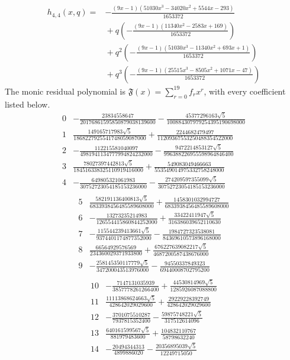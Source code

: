 \[
\begin{split}
h_{4,4}(x,q)={}&- \frac{\left(9 x - 1\right) \left(51030 x^{3} - 34020 x^{2} + 5544 x - 293\right)}{1653372}\\
&{}+q\left(- \frac{\left(9 x - 1\right) \left(11340 x^{2} - 2583 x + 169\right)}{1653372}\right)\\
&{}+q^{2}\left(- \frac{\left(9 x - 1\right) \left(51030 x^{3} - 11340 x^{2} + 693 x + 1\right)}{1653372}\right)\\
&{}+q^{3}\left(- \frac{\left(9 x - 1\right) \left(25515 x^{3} - 8505 x^{2} + 1071 x - 47\right)}{1653372}\right)
\end{split}
\tag{ANP28}
\]
The monic residual polynomial is $\mathfrak F(x)=\sum_{r=0}^{19}f_rx^r$, with every coefficient listed below.
\[
\begin{array}{c|l}
0&- \frac{23834558647}{20176861595850879038139600} - \frac{45377296163 \sqrt{5}}{100884307979254395190698000}\\
1&\frac{149165717983 \sqrt{5}}{1868227925541748059087000} + \frac{2244682479497}{11209367553250488354522000}\\
2&- \frac{112215581040097}{4981941134777994824232000} - \frac{9472214853127 \sqrt{5}}{996388226955598964846400}\\
3&\frac{78027397442813 \sqrt{5}}{184516338325110919416000} + \frac{549083049466663}{553549014975332758248000}\\
4&- \frac{649805321061983}{30752723054185153236000} - \frac{274209597355099 \sqrt{5}}{30752723054185153236000}\\
\end{array}
\tag{ANP29}
\]
\[
\begin{array}{c|l}
5&\frac{582191136400813 \sqrt{5}}{6833938456485589608000} + \frac{1458301032994727}{6833938456485589608000}\\
6&- \frac{13273235214983}{126554415860844252000} + \frac{33422411947 \sqrt{5}}{316386039652110630}\\
7&- \frac{115544239413661 \sqrt{5}}{9374401174877352000} - \frac{1984727323538081}{84369610573896168000}\\
8&\frac{66564929576569}{234360029371933800} + \frac{676227639082217 \sqrt{5}}{4687200587438676000}\\
9&- \frac{258145350117779 \sqrt{5}}{347200043513976000} - \frac{94550337849323}{69440008702795200}\\
\end{array}
\tag{ANP30}
\]
\[
\begin{array}{c|l}
10&- \frac{7147131035939}{3857778261266400} + \frac{44530814969 \sqrt{5}}{1285926087088800}\\
11&\frac{11113868624663 \sqrt{5}}{428642029029600} + \frac{29229228392749}{428642029029600}\\
12&- \frac{3701075510287}{7937815352400} - \frac{59875748221 \sqrt{5}}{317512614096}\\
13&\frac{640161599567 \sqrt{5}}{881979483600} + \frac{104832110767}{58798632240}\\
14&- \frac{20494344313}{4899886020} - \frac{20356895039 \sqrt{5}}{12249715050}\\
\end{array}
\tag{ANP31}
\]
